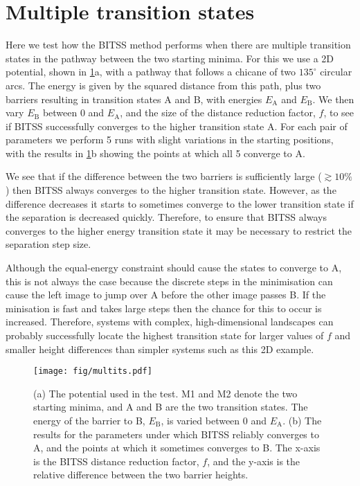 \documentclass[aip,jcp,11pt]{revtex4-2}
\begin{document}
\section{Multiple transition states}
Here we test how the BITSS method performs when there are multiple transition states in the pathway between the two starting minima.
For this we use a 2D potential, shown in \cref{fig:multits}a, with a pathway that follows a chicane of two $135^\circ$ circular arcs.
The energy is given by the squared distance from this path, plus two barriers resulting in transition states A and B, with energies $E_\text{A}$ and $E_\text{B}$.
We then vary $E_\text{B}$ between 0 and $E_\text{A}$, and the size of the distance reduction factor, $f$, to see if BITSS successfully converges to the higher transition state A.
For each pair of parameters we perform 5 runs with slight variations in the starting positions, with the results in \cref{fig:multits}b showing the points at which all 5 converge to A.

We see that if the difference between the two barriers is sufficiently large ($\gtrsim 10\%$) then BITSS always converges to the higher transition state.
However, as the difference decreases it starts to sometimes converge to the lower transition state if the separation is decreased quickly.
Therefore, to ensure that BITSS always converges to the higher energy transition state it may be necessary to restrict the separation step size.

Although the equal-energy constraint should cause the states to converge to A, this is not always the case because the discrete steps in the minimisation can cause the left image to jump over A before the other image passes B.
If the minisation is fast and takes large steps then the chance for this to occur is increased.
Therefore, systems with complex, high-dimensional landscapes can probably successfully locate the highest transition state for larger values of $f$ and smaller height differences than simpler systems such as this 2D example.

\begin{figure}[htb]
  \texttt{[image: fig/multits.pdf]}
  \caption{\label{fig:multits}
    (a) The potential used in the test.
    M1 and M2 denote the two starting minima, and A and B are the two transition states.
    The energy of the barrier to B, $E_\text{B}$, is varied between 0 and $E_\text{A}$.
    (b) The results for the parameters under which BITSS reliably converges to A, and the points at which it sometimes converges to B.
    The x-axis is the BITSS distance reduction factor, $f$, and the y-axis is the relative difference between the two barrier heights.
  }
\end{figure}
\end{document}
